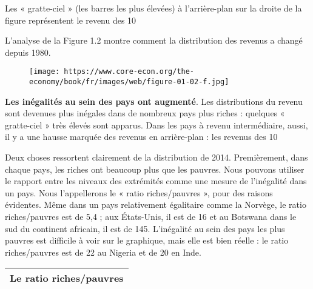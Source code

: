\documentclass[11pt]{amsart}
\begin{document}
Les « gratte-ciel » (les barres les plus élevées) à l’arrière-plan sur la droite de la figure représentent le revenu des 10 %


L’analyse de la Figure 1.2 montre comment la distribution des revenus a changé depuis 1980.


\begin{figure}[h]{}
\centering\texttt{[image: https://www.core-econ.org/the-economy/book/fr/images/web/figure-01-02-f.jpg]}
\caption{}

\end{figure}

\textbf{Les inégalités au sein des pays ont augmenté}.
Les distributions du revenu sont devenues plus inégales dans de nombreux pays plus riches : quelques « gratte-ciel » très élevés sont apparus. Dans les pays à revenu intermédiaire, aussi, il y a une hausse marquée des revenus en arrière-plan : les revenus des 10 %


Deux choses ressortent clairement de la distribution de 2014. Premièrement, dans chaque pays, les riches ont beaucoup plus que les pauvres. Nous pouvons utiliser le rapport entre les niveaux des extrémités comme une mesure de l’inégalité dans un pays. Nous l’appellerons le « ratio riches/pauvres », pour des raisons évidentes. Même dans un pays relativement égalitaire comme la Norvège, le ratio riches/pauvres est de 5,4 ; aux États-Unis, il est de 16 et au Botswana dans le sud du continent africain, il est de 145. L’inégalité au sein des pays les plus pauvres est difficile à voir sur le graphique, mais elle est bien réelle : le ratio riches/pauvres est de 22 au Nigeria et de 20 en Inde.


\begin{center}
\begin{tabular}{|c|}
\hline
\textbf{Le ratio riches/pauvres} \\ 
\hline
\end{tabular}
\end{center}
\end{document}
